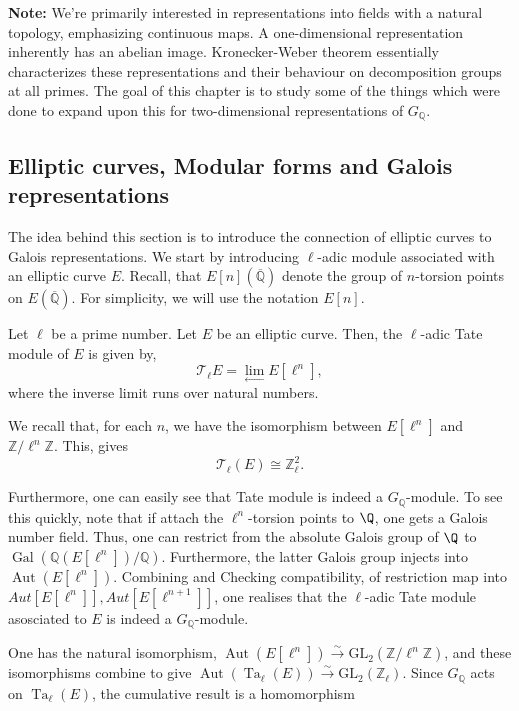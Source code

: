 \textbf{Note:}
We're primarily interested in representations into fields with a natural topology, emphasizing continuous maps. A one-dimensional representation inherently has an abelian image. Kronecker-Weber theorem essentially characterizes these representations and their behaviour on decomposition groups at all primes. The goal of this chapter is to study some of the things which were done to expand upon this for two-dimensional representations of $G_{\mathbb{Q}}$.


\subsection{Elliptic curves, Modular forms and Galois representations}
The idea behind this section is to introduce the connection of elliptic curves to Galois representations. We  start by introducing $\ell$-adic module associated with an elliptic curve $E$. Recall, that $E[n](\overline{\mathbb{Q}})$ denote the group of $n$-torsion points on $E(\overline{\mathbb{Q}})$. For simplicity, we will use the notation $E[n]$. 

\begin{definition}
    Let $\ell$ be a prime number. Let $E$ be an elliptic curve. Then, the $\ell$-adic Tate module of $E$ is given by, $$\mathcal{T}_{\ell} E=\lim _{\leftarrow} E\left[\ell^{n}\right],$$ where the inverse limit runs over natural numbers.
\end{definition}

We recall that, for each $n$, we have the isomorphism between $E\left[\ell^{n}\right]$ and $\mathbb{Z} / \ell^{n} \mathbb{Z}$. This, gives $$
\mathcal{T}_{\ell}(E) \cong \mathbb{Z}_{\ell}^{2}.
$$

Furthermore, one can easily see that Tate module is indeed a \(G_{\mathbb{Q}}\)-module. To see this quickly, note that if attach the $\ell^n$-torsion points to $\Q$, one gets a Galois number field. Thus, one can restrict from the absolute Galois group of $\Q$ to $\operatorname{Gal}(\mathbb{Q}(E[\ell^{n}]) / \mathbb{Q}).$ Furthermore, the latter Galois group injects into $\operatorname{Aut}(E[\ell^{n}]).$ Combining and Checking compatibility, of restriction map into $Aut[E[\ell^{n}]], Aut[E[\ell^{n+1}]]$, one realises that the $\ell$-adic Tate module asosciated to $E$ is indeed a \(G_{\mathbb{Q}}\)-module.


One has the natural isomorphism, \(\operatorname{Aut}\left(E[\ell^{n}]\right) \stackrel{\sim}{\longrightarrow} \mathrm{GL}_{2}\left(\mathbb{Z} / \ell^{n} \mathbb{Z}\right)\), and these isomorphisms combine to give \(\operatorname{Aut}\left(\operatorname{Ta}_{\ell}(E)\right) \stackrel{\sim}{\longrightarrow} \mathrm{GL}_{2}\left(\mathbb{Z}_{\ell}\right)\). Since \(G_{\mathbb{Q}}\) acts on \(\operatorname{Ta}_{\ell}(E)\), the cumulative result is a homomorphism


